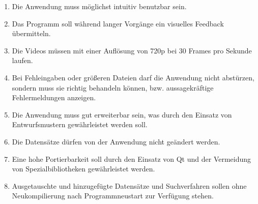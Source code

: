 \begin{enumerate}[label=\bfseries /NF \arabic*0/]
  \item Die Anwendung muss möglichst intuitiv benutzbar sein.
  \item Das Programm soll während langer Vorgänge ein visuelles Feedback übermitteln.
  \item Die Videos müssen mit einer Auflösung  von 720p bei 30 Frames pro Sekunde laufen.
  \item Bei Fehleingaben oder größeren Dateien darf die Anwendung nicht abstürzen, sondern muss sie richtig behandeln können, bzw. aussagekräftige Fehlermeldungen anzeigen.
  \item Die Anwendung muss gut erweiterbar sein, was durch den Einsatz von Entwurfsmustern gewährleistet werden soll.
  \item Die Datensätze dürfen von der Anwendung nicht geändert werden.
  \item Eine hohe Portierbarkeit soll durch den Einsatz von Qt und der Vermeidung von Spezialbibliotheken gewährleistet werden.
  \item Ausgetauschte und hinzugefügte Datensätze und Suchverfahren sollen ohne Neukompilierung nach Programmneustart zur Verfügung stehen.
\end{enumerate}
